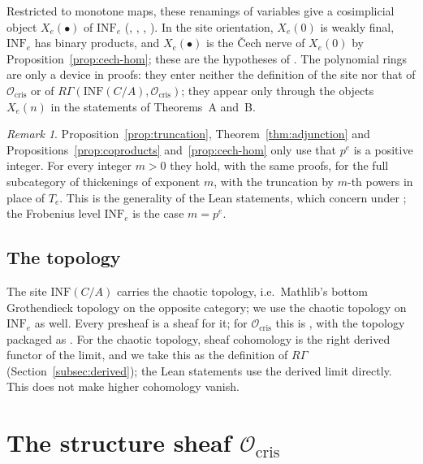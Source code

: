 \documentclass[11pt]{amsart}
\newcommand{\Ocris}{\mathcal{O}_{\mathrm{cris}}}
\newcommand{\INF}{\mathrm{INF}}
\theoremstyle{plain}
\theoremstyle{definition}
\theoremstyle{remark}
\newtheorem{remark}[theorem]{Remark}
\begin{document}
Restricted to monotone maps, these renamings of variables give a cosimplicial object $X_e(\bullet)$ of $\INF_e$ (, , , ). In the site orientation, $X_e(0)$ is weakly final, $\INF_e$ has binary products, and $X_e(\bullet)$ is the Čech nerve of $X_e(0)$ by Proposition~\ref{prop:cech-hom}; these are the hypotheses of \cite[Tag~07JM]{stacks}. The polynomial rings are only a device in proofs: they enter neither the definition of the site nor that of $\Ocris$ or of $R\Gamma(\INF(C/A), \Ocris)$; they appear only through the objects $X_e(n)$ in the statements of Theorems~A and~B.

\begin{remark}\label{rem:general-exponent}
Proposition~\ref{prop:truncation}, Theorem~\ref{thm:adjunction} and Propositions~\ref{prop:coproducts} and~\ref{prop:cech-hom} only use that $p^e$ is a positive integer. For every integer $m > 0$ they hold, with the same proofs, for the full subcategory of thickenings of exponent $m$, with the truncation by $m$-th powers in place of $T_e$. This is the generality of the Lean statements, which concern  under ; the Frobenius level $\INF_e$ is the case $m = p^e$.
\end{remark}

\subsection{The topology}

The site $\INF(C/A)$ carries the chaotic topology, i.e.\ Mathlib's bottom Grothendieck topology on the opposite category; we use the chaotic topology on $\INF_e$ as well. Every presheaf is a sheaf for it; for $\Ocris$ this is , with the topology packaged as . For the chaotic topology, sheaf cohomology is the right derived functor of the limit, and we take this as the definition of $R\Gamma$ (Section~\ref{subsec:derived}); the Lean statements use the derived limit directly. This does not make higher cohomology vanish.

\section{The structure sheaf \texorpdfstring{$\Ocris$}{Ocris}}\label{sec:ocris}
\end{document}
